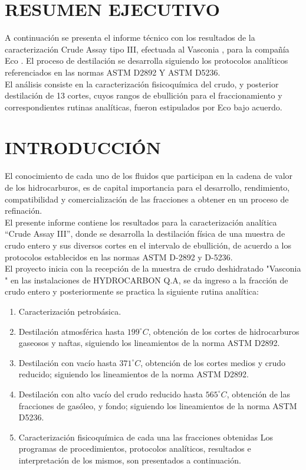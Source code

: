 \documentclass[12pt]{article}
\newcommand{\Client}{Eco }
\newcommand{\Sample}{Vasconia }
\begin{document}
\section*{RESUMEN EJECUTIVO}
\vspace{30 pt }

A continuación se presenta el informe técnico con los resultados de la
caracterización Crude Assay tipo III, efectuada al \Sample, para la compañía \Client. El proceso de destilación se
desarrolla siguiendo los protocolos analíticos referenciados en las normas ASTM
D2892 Y ASTM D5236.\\

El análisis consiste en la caracterización fisicoquímica del crudo, y posterior
destilación de 13 cortes, cuyos rangos de ebullición para el fraccionamiento y
correspondientes rutinas analíticas, fueron estipulados por \Client bajo
acuerdo. 
\newpage
\section*{INTRODUCCIÓN}
El conocimiento de cada uno de los fluidos que participan en la cadena de valor de
los hidrocarburos, es de capital importancia para el desarrollo, rendimiento,
compatibilidad y comercialización de las fracciones a obtener en un proceso de
refinación.\\

El presente informe contiene los resultados para la caracterización analítica
“Crude Assay III”, donde se desarrolla la destilación física de una muestra de
crudo entero y sus diversos cortes en el intervalo de ebullición, de acuerdo a los
protocolos establecidos en las normas ASTM D-2892 y D-5236.\\

El proyecto inicia con la recepción de la muestra de crudo deshidratado "\Sample" en las instalaciones de HYDROCARBON Q.A, se da ingreso a la fracción de crudo entero y posteriormente se practica la siguiente rutina analítica:
\begin{enumerate}
\item Caracterización petrobásica.
\item  Destilación atmosférica hasta $199^{\circ}C $, obtención de los cortes de
hidrocarburos gaseosos y naftas, siguiendo los lineamientos de la norma
ASTM D2892.
\item Destilación con vacío hasta $371^{\circ}C $, obtención de los cortes medios y crudo
reducido; siguiendo los lineamientos de la norma ASTM D2892.
\item Destilación con alto vacío del crudo reducido hasta $565^{\circ}C $, obtención de las
fracciones de gasóleo, y fondo; siguiendo los lineamientos de la norma
ASTM D5236.
\item Caracterización fisicoquímica de cada una las fracciones obtenidas
Los programas de procedimientos, protocolos analíticos, resultados e
interpretación de los mismos, son presentados a continuación.
\end{enumerate}
\end{document}
